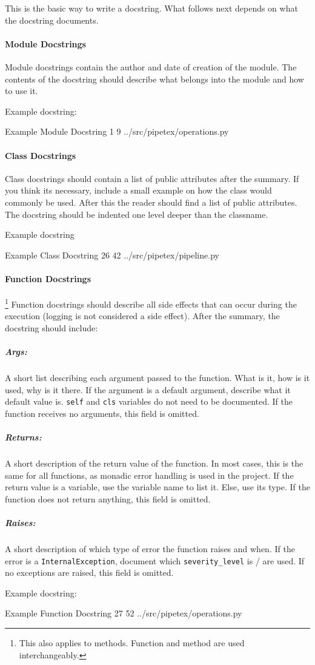 This is the basic way to write a docstring. What follows next depends on what
the docstring documents.

\paragraph{Module Docstrings} Module docstrings contain the author and date of
creation of the module. The contents of the docstring should describe what
belongs into the module and how to use it.

Example docstring:

\codeexample
{Example Module Docstring}
{1}
{9}
{../src/pipetex/operations.py}

\paragraph{Class Docstrings} Class docstrings should contain a list of public
attributes after the summary. If you think its necessary, include a small 
example on how the class would commonly be used. After this the reader should
find a list of public attributes. The docstring should be indented one level
deeper than the classname.

Example docstring

\codeexample
{Example Class Docstring}
{26}
{42}
{../src/pipetex/pipeline.py}

\paragraph{Function Docstrings}\footnote{This also applies to methods. Function
and method are used interchangeably.} Function docstrings should describe all
side effects that can occur during the execution (logging is not considered a
side effect). After the summary, the docstring should include:

\subparagraph{Args:} A short list describing each argument passed to the
function.  What is it, how is it used, why is it there. If the argument is a
default argument, describe what it default value is. \verb|self| and \verb|cls|
variables do not need to be documented. If the function receives no arguments,
this field is omitted.

\subparagraph{Returns:} A short description of the return value of the
function.  In most cases, this is the same for all functions, as monadic error
handling is used in the project. If the return value is a variable, use the
variable name to list it. Else, use its type. If the function does not return
anything, this field is omitted.

\subparagraph{Raises:} A short description of which type of error the function
raises and when. If the error is a \verb|InternalException|, document which
\verb|severity_level| is / are used. If no exceptions are raised, this field is
omitted.

Example docstring:

\codeexample
{Example Function Docstring}
{27}
{52}
{../src/pipetex/operations.py}

